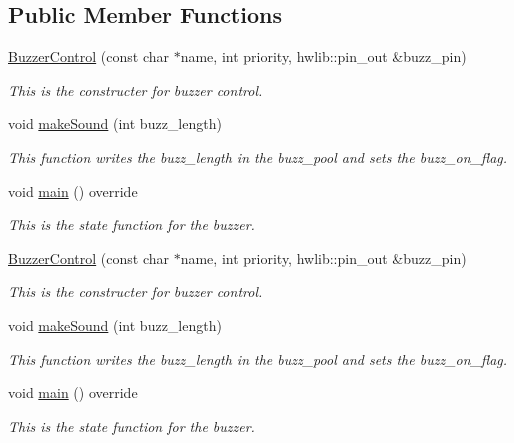 \subsection*{Public Member Functions}
\begin{DoxyCompactItemize}
\item 
\mbox{\hyperlink{class_buzzer_control_a25b3a51e33513aeeb0beb137463bbe70}{Buzzer\+Control}} (const char $\ast$name, int priority, hwlib\+::pin\+\_\+out \&buzz\+\_\+pin)
\begin{DoxyCompactList}\small\item\em This is the constructer for buzzer control. \end{DoxyCompactList}\item 
\mbox{\label{class_buzzer_control_a2c485c8888d861efae8461a87a47685f}} 
void \mbox{\hyperlink{class_buzzer_control_a2c485c8888d861efae8461a87a47685f}{make\+Sound}} (int buzz\+\_\+length)
\begin{DoxyCompactList}\small\item\em This function writes the buzz\+\_\+length in the buzz\+\_\+pool and sets the buzz\+\_\+on\+\_\+flag. \end{DoxyCompactList}\item 
void \mbox{\hyperlink{class_buzzer_control_ae249e78ba5c0399e8b14091a0a8254eb}{main}} () override
\begin{DoxyCompactList}\small\item\em This is the state function for the buzzer. \end{DoxyCompactList}\item 
\mbox{\hyperlink{class_buzzer_control_a25b3a51e33513aeeb0beb137463bbe70}{Buzzer\+Control}} (const char $\ast$name, int priority, hwlib\+::pin\+\_\+out \&buzz\+\_\+pin)
\begin{DoxyCompactList}\small\item\em This is the constructer for buzzer control. \end{DoxyCompactList}\item 
\mbox{\label{class_buzzer_control_a2c485c8888d861efae8461a87a47685f}} 
void \mbox{\hyperlink{class_buzzer_control_a2c485c8888d861efae8461a87a47685f}{make\+Sound}} (int buzz\+\_\+length)
\begin{DoxyCompactList}\small\item\em This function writes the buzz\+\_\+length in the buzz\+\_\+pool and sets the buzz\+\_\+on\+\_\+flag. \end{DoxyCompactList}\item 
void \mbox{\hyperlink{class_buzzer_control_ae249e78ba5c0399e8b14091a0a8254eb}{main}} () override
\begin{DoxyCompactList}\small\item\em This is the state function for the buzzer. \end{DoxyCompactList}\end{DoxyCompactItemize}


